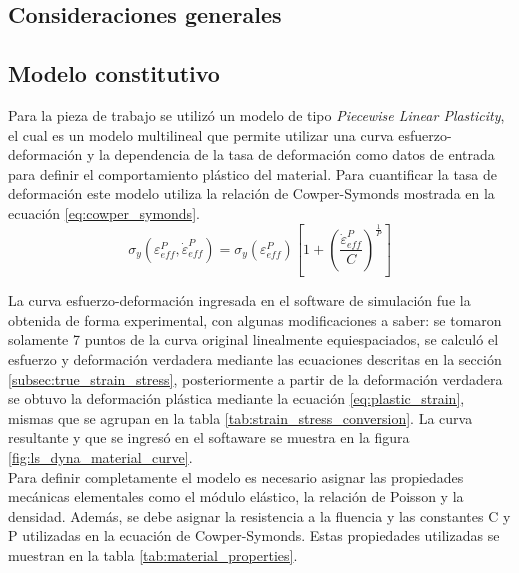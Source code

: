 \subsection{Consideraciones generales}\label{consideraciones-generales}



\subsection{Modelo constitutivo}

Para la pieza de trabajo se utilizó un modelo de tipo \textit{Piecewise Linear Plasticity}, 
el cual es un modelo multilineal que permite utilizar una curva esfuerzo-deformación y la 
dependencia de la tasa de deformación como datos de entrada para definir el comportamiento 
plástico del material. Para cuantificar la tasa de deformación este modelo utiliza la 
relación de Cowper-Symonds mostrada en la ecuación \ref{eq:cowper_symonds}.\\

\begin{equation} \label{eq:cowper_symonds}
\sigma_{y}\left( \varepsilon _{eff}^{P},\dot{\varepsilon }_{eff}^{P} \right) = 
{{\sigma }_{y}}\left( \varepsilon _{eff}^{P} \right)\left[ 1+{{\left( \frac{\dot{\varepsilon }_{eff}^{P}}{C} \right)}^{\frac{1}{P}}} \right]
\end{equation}

La curva esfuerzo-deformación ingresada en el software de simulación fue la obtenida 
de forma experimental, con algunas modificaciones a saber: se tomaron solamente 7 puntos 
de la curva original linealmente equiespaciados, se calculó el esfuerzo y deformación verdadera 
mediante las ecuaciones descritas en la sección \ref{subsec:true_strain_stress}, posteriormente 
a partir de la deformación verdadera se obtuvo la deformación plástica mediante la 
ecuación \ref{eq:plastic_strain}, mismas que se agrupan en la tabla \ref{tab:strain_stress_conversion}.
La curva resultante y que se ingresó en el softaware se muestra en la figura \ref{fig:ls_dyna_material_curve}. \\

Para definir completamente el modelo es necesario asignar las propiedades mecánicas elementales 
como el módulo elástico, la relación de Poisson y la densidad. Además, se debe asignar 
la resistencia a la fluencia y las constantes C y P utilizadas en la ecuación de Cowper-Symonds.
Estas propiedades utilizadas se muestran en la tabla \ref{tab:material_properties}. \\

